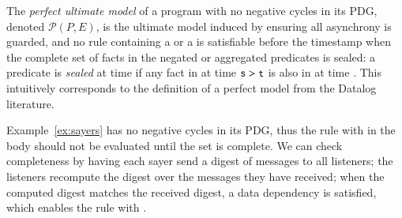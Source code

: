 \begin{definition}
The {\em perfect ultimate model} of a \lang program with no negative cycles in its PDG, denoted $\mathcal{P}(P, E)$, is the ultimate model induced by ensuring all asynchrony is guarded, and no rule containing a \dedalus{!} or a  is satisfiable before the timestamp when the complete set of facts in the negated or aggregated predicates is sealed: a predicate  is {\em sealed} at time  if any fact in  at time $\dedalus{s} > \dedalus{t}$ is also in  at time .  
This intuitively corresponds to the definition of a perfect model from the Datalog literature.
\end{definition}


Example~\ref{ex:sayers} has no negative cycles in its PDG, thus the rule with  in the body should not be evaluated until the  set is complete.  We can check completeness by having each sayer send a digest of  messages to all listeners; the listeners recompute the digest over the  messages they have received; when the computed digest matches the received digest, a data dependency is satisfied, which enables the rule with .



